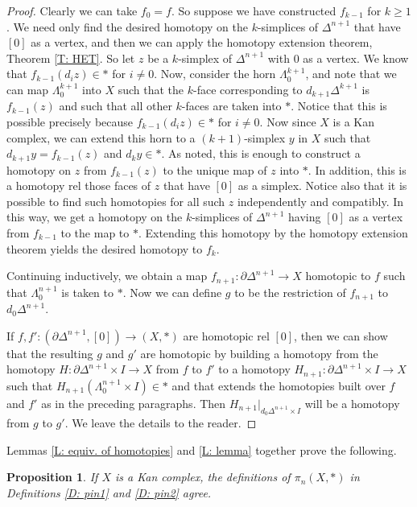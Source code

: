 \documentclass[12pt]{article}
\theoremstyle{plain}
\newtheorem{proposition}[theorem]{Proposition}
\theoremstyle{definition}
\newcommand{\bd}{\partial}
\begin{document}
\begin{proof}
Clearly we can take $f_0=f$. So suppose we have constructed $f_{k-1}$ for $k\geq 1$. We need only find the desired homotopy on the $k$-simplices of $\Delta^{n+1}$ that have $[0]$ as a vertex, and then we can apply the homotopy extension theorem, Theorem \ref{T: HET}. So let $z$ be a $k$-simplex of $\Delta^{n+1}$ with $0$ as a vertex. We know that $f_{k-1}(d_iz)\in *$ for $i\neq 0$. Now, consider the horn $\Lambda^{k+1}_0$, and note that we can map $\Lambda^{k+1}_0$ into $X$ such that the $k$-face corresponding to $d_{k+1}\Delta^{k+1}$ is $f_{k-1}(z)$ and such that all other $k$-faces are taken into $*$. Notice that this is possible precisely because $f_{k-1}(d_iz)\in *$ for $i\neq 0$. Now since $X$ is a Kan complex, we can extend this horn to a $(k+1)$-simplex $y$ in $X$ such that $d_{k+1}y=f_{k-1}(z)$ and $d_ky\in *$.  As noted, this is enough to construct a homotopy on $z$ from $f_{k-1}(z)$ to the unique map of $z$ into $*$. In addition, this is a homotopy rel those faces of $z$ that have $[0]$ as a simplex.
Notice also that it is possible to find such homotopies for all such $z$ independently and compatibly. In this way, we get a homotopy on the $k$-simplices of $\Delta^{n+1}$ having $[0]$ as a vertex from $f_{k-1}$ to the map to $*$.  Extending this homotopy by the homotopy extension theorem yields the desired homotopy to $f_k$. 

Continuing inductively, we obtain a map $f_{n+1}\colon \bd \Delta^{n+1}\to X$ homotopic to $f$ such that $\Lambda^{n+1}_0$ is taken to $*$. Now we can define $g$ to be the restriction of $f_{n+1}$ to $d_0\Delta^{n+1}$.  


If $f,f'\colon (\bd \Delta^{n+1},[0])\to (X,*)$ are homotopic rel $[0]$, then we can show that the resulting $g$ and $g'$ are homotopic  by building a homotopy from the homotopy $H\colon \bd \Delta^{n+1}\times I\to X$ from $f$ to $f'$ to a homotopy $H_{n+1}\colon \bd \Delta^{n+1}\times I\to X$ such that  $H_{n+1}(\Lambda^{n+1}_0\times I)\in *$ and that extends the homotopies built over $f$ and $f'$ as in the preceding paragraphs. Then $H_{n+1}|_{d_0\Delta^{n+1}\times I}$ will be a homotopy from $g$ to $g'$. We leave the details to the reader. 
\end{proof}

Lemmas \ref{L: equiv. of homotopies} and \ref{L: lemma} together prove the following.

\begin{proposition}
If $X$ is a Kan complex, the definitions of $\pi_n(X,*)$ in Definitions \ref{D: pin1} and \ref{D: pin2} agree.
\end{proposition}
\end{document}
